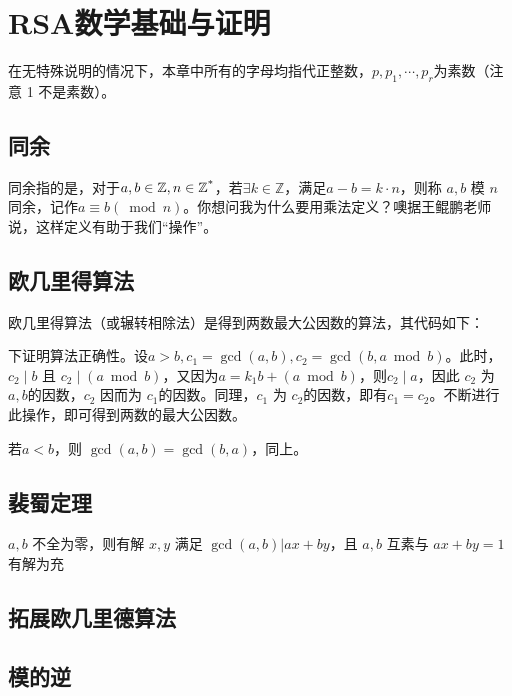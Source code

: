 \documentclass[a4paper]{article}         %
\begin{document}
\section{RSA数学基础与证明} \label{RSA数学基础与证明}

在无特殊说明的情况下，本章中所有的字母均指代正整数，$p,p_1,\cdots,p_r$为素数（注意 1 不是素数）。

\subsection{同余}

同余指的是，对于$a, b \in \mathbb{Z}, n \in \mathbb{Z\textsuperscript{*}}$，若$\exists k \in \mathbb{Z}$，满足$a - b = k \cdot n$，则称 $a, b$ 模 $n$ 同余，记作$a \equiv b (\bmod n)$。你想问我为什么要用乘法定义？噢据王鲲鹏老师说，这样定义有助于我们“操作”。

\subsection{欧几里得算法}

欧几里得算法（或辗转相除法）是得到两数最大公因数的算法，其代码如下：



下证明算法正确性。设$a > b, c_1 = \gcd(a, b), c_2 = \gcd(b, a \bmod b)$。此时，$c_2 \mid b$ 且 $c_2 \mid (a \bmod b)$，又因为$a = k_1b + (a \bmod b)$，则$c_2 \mid a$，因此 $c_2$ 为 $a, b$的因数，$c_2$ 因而为 $c_1$的因数。同理，$c_1$ 为 $c_2$的因数，即有$c_1 = c_2$。不断进行此操作，即可得到两数的最大公因数。

若$a < b$，则 $\gcd(a, b) = \gcd(b, a)$，同上。

\subsection{裴蜀定理}

$a, b$ 不全为零，则有解 $x, y$ 满足 $\gcd(a, b) \vert ax + by$，且 $a, b$ 互素与 $ax + by = 1$ 有解为充

\subsection{拓展欧几里德算法}


\subsection{模的逆}
\end{document}
